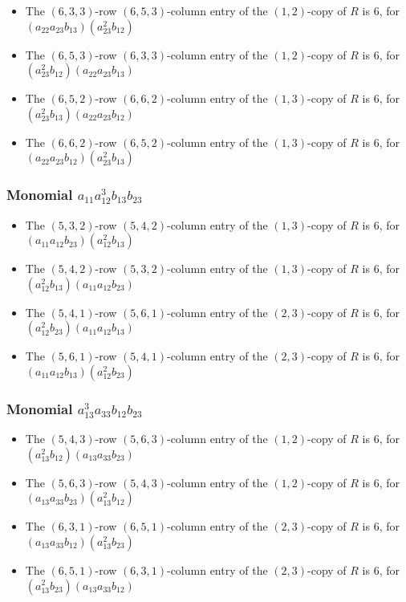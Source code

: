 \documentclass{article}
\begin{document}
\begin{itemize}
\item The $(6, 3, 3)$-row $(6, 5, 3)$-column entry of the $ \left(1, 2\right) $-copy of $R$ is $ 6 $, for $( a_{22} a_{23} b_{13} )( a_{23}^{2} b_{12} )$ 
\item The $(6, 5, 3)$-row $(6, 3, 3)$-column entry of the $ \left(1, 2\right) $-copy of $R$ is $ 6 $, for $( a_{23}^{2} b_{12} )( a_{22} a_{23} b_{13} )$ 
\item The $(6, 5, 2)$-row $(6, 6, 2)$-column entry of the $ \left(1, 3\right) $-copy of $R$ is $ 6 $, for $( a_{23}^{2} b_{13} )( a_{22} a_{23} b_{12} )$ 
\item The $(6, 6, 2)$-row $(6, 5, 2)$-column entry of the $ \left(1, 3\right) $-copy of $R$ is $ 6 $, for $( a_{22} a_{23} b_{12} )( a_{23}^{2} b_{13} )$ 
\end{itemize}
\subsubsection{Monomial $ a_{11} a_{12}^{3} b_{13} b_{23} $}

\begin{itemize}
\item The $(5, 3, 2)$-row $(5, 4, 2)$-column entry of the $ \left(1, 3\right) $-copy of $R$ is $ 6 $, for $( a_{11} a_{12} b_{23} )( a_{12}^{2} b_{13} )$ 
\item The $(5, 4, 2)$-row $(5, 3, 2)$-column entry of the $ \left(1, 3\right) $-copy of $R$ is $ 6 $, for $( a_{12}^{2} b_{13} )( a_{11} a_{12} b_{23} )$ 
\item The $(5, 4, 1)$-row $(5, 6, 1)$-column entry of the $ \left(2, 3\right) $-copy of $R$ is $ 6 $, for $( a_{12}^{2} b_{23} )( a_{11} a_{12} b_{13} )$ 
\item The $(5, 6, 1)$-row $(5, 4, 1)$-column entry of the $ \left(2, 3\right) $-copy of $R$ is $ 6 $, for $( a_{11} a_{12} b_{13} )( a_{12}^{2} b_{23} )$ 
\end{itemize}
\subsubsection{Monomial $ a_{13}^{3} a_{33} b_{12} b_{23} $}

\begin{itemize}
\item The $(5, 4, 3)$-row $(5, 6, 3)$-column entry of the $ \left(1, 2\right) $-copy of $R$ is $ 6 $, for $( a_{13}^{2} b_{12} )( a_{13} a_{33} b_{23} )$ 
\item The $(5, 6, 3)$-row $(5, 4, 3)$-column entry of the $ \left(1, 2\right) $-copy of $R$ is $ 6 $, for $( a_{13} a_{33} b_{23} )( a_{13}^{2} b_{12} )$ 
\item The $(6, 3, 1)$-row $(6, 5, 1)$-column entry of the $ \left(2, 3\right) $-copy of $R$ is $ 6 $, for $( a_{13} a_{33} b_{12} )( a_{13}^{2} b_{23} )$ 
\item The $(6, 5, 1)$-row $(6, 3, 1)$-column entry of the $ \left(2, 3\right) $-copy of $R$ is $ 6 $, for $( a_{13}^{2} b_{23} )( a_{13} a_{33} b_{12} )$ 
\end{itemize}
\end{document}
